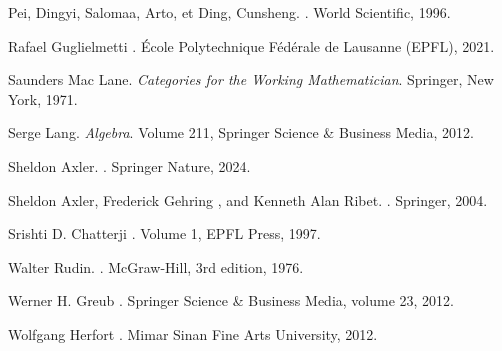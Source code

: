\documentclass[a4paper, 14pt]{report}
\begin{document}
\begin{onehalfspace}
{\begin{thebibliography}{99}
				Pei, Dingyi, Salomaa, Arto, et Ding, Cunsheng.
				.
				\newblock World Scientific, 1996.
				
				Rafael Guglielmetti  
				.  
				\newblock École Polytechnique Fédérale de Lausanne (EPFL), 2021. 
				
				Saunders Mac Lane.
				\newblock \emph{Categories for the Working Mathematician}.
				\newblock Springer, New York, 1971.
				
				Serge Lang.
				\newblock \emph{Algebra}.
				\newblock Volume 211, Springer Science \& Business Media, 2012.
				
				
				Sheldon Axler.
				.
				\newblock Springer Nature, 2024.
				
				Sheldon Axler, Frederick Gehring , and Kenneth Alan Ribet.
				.
				\newblock Springer, 2004.
				
				Srishti D. Chatterji  
				.  
				\newblock Volume 1, EPFL Press, 1997.
				
				Walter Rudin.  
				.  
				\newblock McGraw-Hill, 3rd edition, 1976.
				
				Werner H. Greub
				.
				\newblock Springer Science \& Business Media, volume 23, 2012.
				
				
				Wolfgang Herfort  
				.  
				\newblock Mimar Sinan Fine Arts University, 2012. 
				
				
				
				
				
				
				
				
				
				
				
				
				
				
				
				
				
				
				
				
			\end{thebibliography}
			
		}
		
		
	\end{onehalfspace} 
	
	
	
	
	
	
\end{document}
